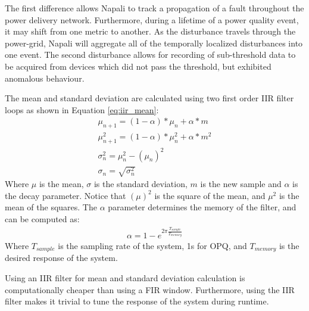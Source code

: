 The first difference allows Napali to track a propagation of a fault throughout the power delivery network.
Furthermore, during a lifetime of a power quality event, it may shift from one metric to another.
As the disturbance travels through the power-grid, Napali will aggregate all of the temporally localized disturbances into one event.
The second disturbance allows for recording of sub-threshold data to be acquired from devices which did not pass the threshold, but exhibited anomalous behaviour.

The mean and standard deviation are calculated using two first order IIR filter loops as shown in Equation \ref{eq:iir_mean}:
\begin{equation}\label{eq:iir_mean}
\begin{aligned}
	\mu_{n+1} = (1- \alpha)*\mu_{n} + \alpha * m \\
	\mu^2_{n+1} = (1- \alpha)*\mu^2_n + \alpha * m^2 \\
	\sigma^2_n = \mu^2_n - (\mu_n)^2 \\
	\sigma_n =\sqrt{\sigma_n^2}
\end{aligned}
\end{equation}
Where $\mu$ is the mean, $\sigma$ is the standard deviation, $m$ is the new sample and $\alpha$ is the decay parameter.
Notice that $(\mu)^2$ is the square of the mean, and $\mu^2$ is the mean of the squares.
The $\alpha$ parameter determines the memory of the filter, and can be computed as:
\begin{equation}\label{eq:iir_alpha}
\begin{aligned}
	\alpha = 1 - e^{2\pi\frac{T_{sample}}{T_{memory}}}
\end{aligned}
\end{equation}
Where $T_{sample}$ is the sampling rate of the system, 1s for OPQ, and $T_{memory}$ is the desired response of the system.

Using an IIR filter for mean and standard deviation calculation is computationally cheaper than using a FIR window.
Furthermore, using the IIR filter makes it trivial to tune the response of the system during runtime.

